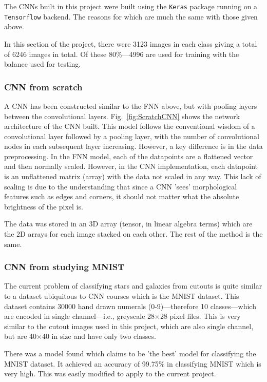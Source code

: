 \documentclass[a4paper,fleqn,usenatbib]{mnras}
\begin{document}
The CNNs built in this project were built using the \texttt{Keras} package running on a \texttt{Tensorflow} backend. The reasons for which are much the same with those given above. 

In this section of the project, there were 3123 images in each class giving a total of 6246 images in total. Of these 80\%---4996 are used for training with the balance used for testing. 

\subsubsection{CNN from scratch}
A CNN has been constructed similar to the FNN above, but with pooling layers between the convolutional layers. Fig.~\ref{fig:ScratchCNN} shows the network architecture of the CNN built. This model follows the conventional wisdom of a convolutional layer followed by a pooling layer, with the number of convolutional nodes in each subsequent layer increasing. However, a key difference is in the data preprocessing. In the FNN model, each of the datapoints are a flattened vector and then normally scaled. However, in the CNN implementation, each datapoint is an unflattened matrix (array) with the data not scaled in any way. This lack of scaling is due to the understanding that since a CNN 'sees' morphological features such as edges and corners, it should not matter what the absolute brightness of the pixel is. 

The data was stored in an 3D array (tensor, in linear algebra terms) which are the 2D arrays for each image stacked on each other. The rest of the method is the same. 

\subsubsection{CNN from studying MNIST}
The current problem of classifying stars and galaxies from cutouts is quite similar to a dataset ubiquitous to CNN courses which is the MNIST dataset.\cite{MNIST} This dataset contains 30000 hand drawn numerals (0-9)---therefore 10 classes---which are encoded in single channel---i.e., greyscale 28$\times$28 pixel files. This is very similar to the cutout images used in this project, which are also single channel, but are 40$\times$40 in size and have only two classes. 

There was a model found which claims to be 'the best' model for classifying the MNIST dataset. \cite{KaggleMNIST} It achieved an accuracy of 99.75\% in classifying MNIST which is very high. This was easily modified to apply to the current project. 
\end{document}
